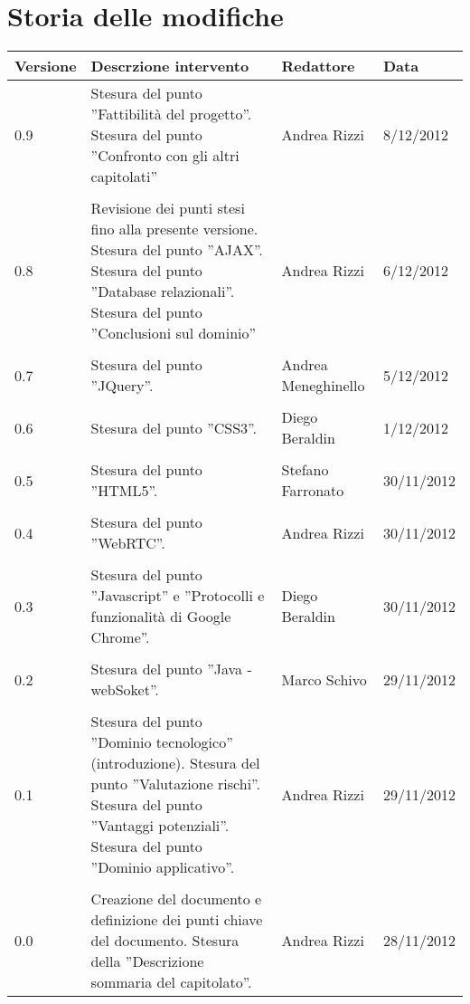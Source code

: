 \section*{Storia delle modifiche}
\begin{tabularx}{\textwidth}{lXll}
\toprule
Versione & Descrzione intervento & Redattore & Data\\
\midrule %
0.9 & Stesura del punto ''Fattibilità del progetto''. Stesura del punto ''Confronto con gli altri capitolati'' & Andrea Rizzi & 8/12/2012\\\\
0.8 & Revisione dei punti stesi fino alla presente versione. Stesura del punto ''AJAX''. Stesura del punto ''Database relazionali''. Stesura del punto ''Conclusioni sul dominio'' & Andrea Rizzi & 6/12/2012\\\\
0.7 & Stesura del punto ''JQuery''. & Andrea Meneghinello & 5/12/2012\\\\
0.6 & Stesura del punto ''CSS3''. & Diego Beraldin & 1/12/2012\\\\
0.5 & Stesura del punto ''HTML5''. & Stefano Farronato & 30/11/2012\\\\
0.4 & Stesura del punto ''WebRTC''. & Andrea Rizzi & 30/11/2012\\\\
0.3 & Stesura del punto ''Javascript'' e ''Protocolli e funzionalità di Google Chrome''.  & Diego Beraldin & 30/11/2012\\\\
0.2 & Stesura del punto ''Java - webSoket''.  & Marco Schivo & 29/11/2012\\\\
0.1 & Stesura del punto ''Dominio tecnologico'' (introduzione). Stesura del punto ''Valutazione rischi''. Stesura del punto ''Vantaggi potenziali''. Stesura del punto ''Dominio applicativo''.  & Andrea Rizzi & 29/11/2012\\\\
0.0 & Creazione del documento e definizione dei punti chiave del documento. Stesura della ''Descrizione sommaria del capitolato''. & Andrea Rizzi & 28/11/2012\\
\bottomrule
\end{tabularx}
\newpage



\setcounter{page}{1}
\pagestyle{normal}





